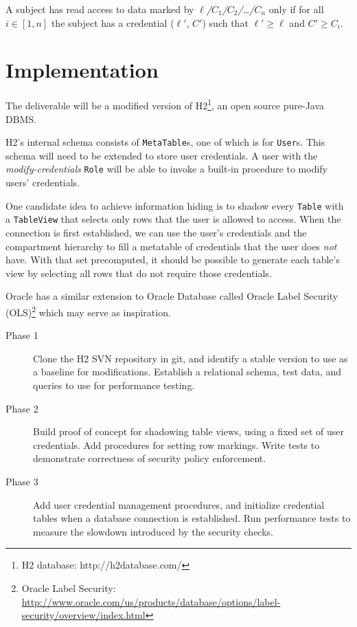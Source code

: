 \documentclass{article}
\begin{document}
A subject has read access to data marked by {\it $\ell$/$C_1$/$C_2$/\ldots/$C_n$} only if for all $i \in [1, n]$ the subject has a credential ($\ell'$, $C'$) such that $\ell' \ge \ell$ and $C' \ge C_i$.

\section{Implementation}

The deliverable will be a modified version of H2\footnote{H2 database: http://h2database.com/}, an open source pure-Java DBMS.

H2's internal schema consists of {\tt MetaTable}s, one of which is for {\tt User}s. This schema will need to be extended to store user credentials. A user with the {\it modify-credentials} {\tt Role} will be able to invoke a built-in procedure to modify users' credentials.

One candidate idea to achieve information hiding is to shadow every {\tt Table} with a {\tt TableView} that selects only rows that the user is allowed to access. When the connection is first established, we can use the user's credentials and the compartment hierarchy to fill a metatable of credentials that the user does {\it not} have. With that set precomputed, it should be possible to generate each table's view by selecting all rows that do not require those credentials.

Oracle has a similar extension to Oracle Database called Oracle Label Security (OLS)\footnote{Oracle Label Security: \url{http://www.oracle.com/us/products/database/options/label-security/overview/index.html}} which may serve as inspiration.

\begin{description}

  \item[Phase 1] Clone the H2 SVN repository in git, and identify a stable version to use as a baseline for modifications. Establish a relational schema, test data, and queries to use for performance testing.

  \item[Phase 2] Build proof of concept for shadowing table views, using a fixed set of user credentials. Add procedures for setting row markings. Write tests to demonstrate correctness of security policy enforcement.

  \item[Phase 3] Add user credential management procedures, and initialize credential tables when a database connection is established. Run performance tests to measure the slowdown introduced by the security checks.

\end{description}
\end{document}
